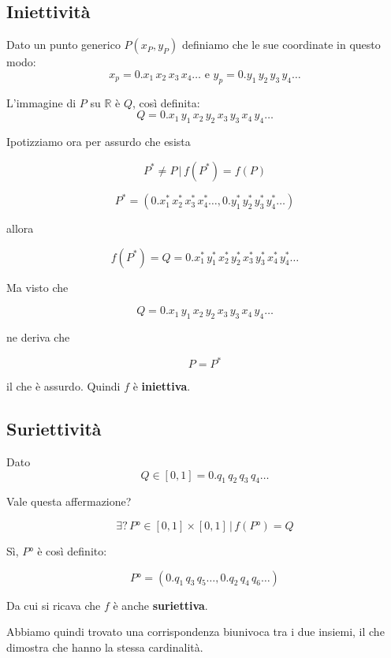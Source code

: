 \documentclass[../dimostrazioni]{subfiles}
\begin{document}
            \subsection*{Iniettività}

                Dato un punto generico \(P (x_P,y_P) \) definiamo che le sue coordinate in questo modo:
                \[  x_p = 0.x_1 \, x_2 \, x_3 \, x_4 \dots \, \, \text{e} \, \, y_p = 0.y_1 \, y_2 \, y_3 \, y_ 4 \dots \]

                L'immagine di \(P\) su \( \mathbb{R} \) è \( Q \), così definita:
                \[   Q = 0.x_1 \, y_1 \, x_2 \, y_2 \, x_3 \, y_3 \, x_4 \, y_ 4 \dots    \]

                Ipotizziamo ora per assurdo che esista 

                \[    P^* \neq P \, | \, f(P^*) = f(P) \]

                \[    P^* = (0.x^*_1 \, x^*_2 \, x^*_3 \, x^*_4 \dots , 0.y^*_1 \, y^*_2 \, y^*_3 \, y^*_4 \dots) \]

                allora

                \[    f(P^*) = Q = 0.x^*_1 \, y^*_1 \, x^*_2 \, y^*_2 \, x^*_3 \, y^*_3 \, x^*_4 \, y^*_4 \dots \]

                Ma visto che

                \[ Q = 0.x_1 \, y_1 \, x_2 \, y_2 \, x_3 \, y_3 \, x_4 \, y_ 4 \dots \]

                ne deriva che

                \[P = P^*\]

                il che è assurdo. Quindi \(f\) è \textbf{iniettiva}.

            \subsection*{Suriettività}

                Dato
                \[    Q \in [0,1] = 0.q_1 \, q_2 \, q_3 \, q_4 \dots    \]

                Vale questa affermazione?

                \[    \exists \text{?} \, P° \in [0,1] \times [0,1] \, | \, f(P°) = Q    \]

                Sì, \(P°\) è così definito:

                \[    P° = (0.q_1 \, q_3 \, q_5 \dots, 0.q_2 \, q_4 \, q_6 \dots)    \]

                Da cui si ricava che \(f\) è anche \textbf{suriettiva}.

                \bigskip

                Abbiamo quindi trovato una corrispondenza biunivoca tra i due insiemi, il che dimostra che hanno la stessa cardinalità.
            
\end{document}
